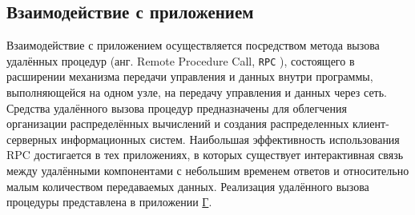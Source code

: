 \subsection{Взаимодействие с приложением}

Взаимодействие с приложением осуществляется посредством метода вызова удалённых процедур (анг. Remote Procedure Call, \texttt{RPC} \cite{rpc}), состоящего в расширении механизма передачи управления и данных внутри программы, выполняющейся на одном узле, на передачу управления и данных через сеть. Средства удалённого вызова процедур предназначены для облегчения организации распределённых вычислений и создания распределенных клиент-серверных информационных систем. Наибольшая эффективность использования RPC достигается в тех приложениях, в которых существует интерактивная связь между удалёнными компонентами с небольшим временем ответов и относительно малым количеством передаваемых данных. Реализация удалённого вызова процедуры представлена в приложении \hyperref[app:rpc]{Г}.
